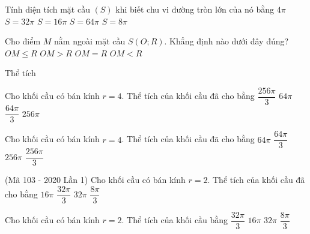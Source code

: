 \begin{ex}
	Tính diện tích mặt cầu $(S)$ khi biết chu vi đường tròn lớn của nó bằng $4\pi $ 
	\choice
	{$S=32\pi $}
	{\True $S=16\pi $}
	{$S=64\pi $}
	{$S=8\pi $}
\end{ex}
\begin{ex}
	[Mã 103 - 2022]%
	Cho điểm $M$ nằm ngoài mặt cầu $S\left(O;R\right)$. Khẳng định nào dưới đây đúng?
	\choice
	{$OM\le R$}
	{\True $OM>R$}
	{$OM=R$}
	{$OM<R$}
	\loigiai{}
\end{ex}
\begin{dang}
	{Thể tích}
\end{dang}
\begin{ex}
	[Mã 101 - 2020 Lần 1]%
	Cho khối cầu có bán kính $r=4$. Thể tích của khối cầu đã cho bằng
	\choice
	{\True $\dfrac{256\pi}{3}$}
	{$64\pi $}
	{$\dfrac{64\pi}{3}$}
	{$256\pi $}
\end{ex}
\begin{ex}
	[Mã 102 - 2020 Lần 1]%
	Cho khối cầu có bán kính $r=4$. Thể tích của khối cầu đã cho bằng
	\choice
	{$64 \pi$}
	{$\dfrac{64 \pi}{3}$}
	{$256 \pi$}
	{\True $\dfrac{256 \pi}{3}$}
\end{ex}
\begin{ex}%
	(Mã 103 - 2020 Lần 1) Cho khối cầu có bán kính $r=2$. Thể tích của khối cầu đã cho bằng
	\choice
	{$16\pi $}
	{\True $\dfrac{32\pi}{3}$}
	{$32\pi $}
	{$\dfrac{8\pi}{3}$}
\end{ex}
\begin{ex}
	[Mã 104 - 2020 Lần 1]%
	Cho khối cầu có bán kính $r=2$. Thể tích của khối cầu bằng
	\choice
	{\True $\dfrac{32\pi}{3}$}
	{$16\pi $}
	{$32\pi $}
	{$\dfrac{8\pi}{3}$}
\end{ex}
